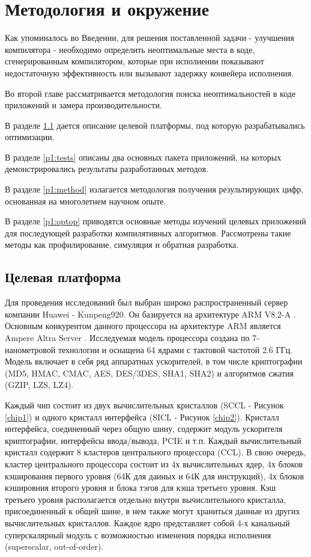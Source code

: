 \chapter{Методология и окружение}\label{ch:chMethod}
Как упоминалось во Введении, для решения поставленной задачи - улучшения компилятора - необходимо определить неоптимальные места в коде, сгенерированным компилятором, которые при исполнении показывают недостаточную эффективность или вызывают задержку конвейера исполнения.

Во второй главе рассматривается методология поиска неоптимальностей в коде приложений и замера производительности. 

В разделе \ref{p1:platform} дается описание целевой платформы, под которую разрабатывались оптимизации.

В разделе  \ref{p1:tests} описаны два основных пакета приложений, на которых демонстрировались результаты разработанных методов.

В разделе \ref{p1:method} излагается методология получения результирующих цифр, основанная на многолетнем научном опыте.

В разделе \ref{p1:optop} приводятся основные методы изучений целевых приложений для последующей разработки компилятивных алгоритмов. Рассмотрены такие методы как профилирование, симуляция и обратная разработка.


\section{Целевая платформа}\label{p1:platform}

Для проведения исследований был выбран широко распространенный сервер компании Huawei - Kunpeng920. Он базируется на архитектуре ARM V8.2-A \cite{reid2016trustworthy,xia2021kunpeng}.  Основным конкурентом данного процессора на архитектуре ARM является Ampere Altra Server \cite{cha2021ampere}.  Исследуемая модель процессора создана по 7-нанометровой технологии и оснащена 64 ядрами с тактовой частотой 2.6 ГГц. Модель включает в себя  ряд аппаратных ускорителей, в том числе криптографии (MD5, HMAC, CMAC, AES, DES/3DES,  SHA1, SHA2) и  алгоритмов сжатия (GZIP, LZS, LZ4). 

Каждый чип состоит из двух вычислительных кристаллов (SCCL - Рисунок \ref{chip1})  и одного кристалл интерфейса (SICL - Рисунок \ref{chip2}). Кристалл интерфейса, соединенный через общую шину, содержит модуль ускорителя криптографии, интерфейсы ввода/вывода, PCIE и т.п. Каждый вычислительный кристалл содержит 8 кластеров центрального процессора (CCL). В свою очередь, кластер центрального процессора состоит из 4х вычислительных ядер, 4х блоков кэширования первого уровня (64К для данных и 64К для инструкций), 4х блоков кэшировния второго уровня и блока тэгов для кэша третьего уровня. Кэш третьего уровня располагается отдельно внутри вычислительного кристалла, присоединенный к общей шине, в нем также могут храниться данные из других вычислительных кристаллов. Каждое ядро представляет собой 4-х канальный суперскалярный модуль с возможностью изменения порядка исполнения (superscalar, out-of-order).

